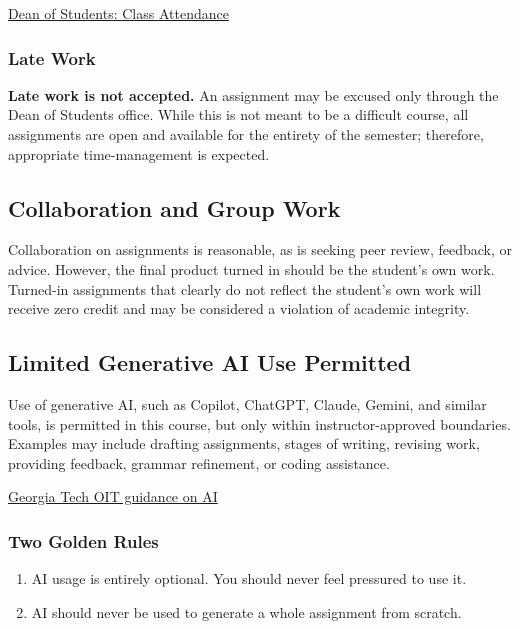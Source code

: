 \documentclass[11pt]{article}
\begin{document}
\href{https://studentlife.gatech.edu/dean-students/class-attendance}{Dean of Students: Class Attendance}

\subsubsection*{Late Work}

\textbf{Late work is not accepted.} An assignment may be excused only through the Dean of Students office. While this is not meant to be a difficult course, all assignments are open and available for the entirety of the semester; therefore, appropriate time-management is expected.

\subsection*{Collaboration and Group Work}

Collaboration on assignments is reasonable, as is seeking peer review, feedback, or advice. However, the final product turned in should be the student's own work. Turned-in assignments that clearly do not reflect the student's own work will receive zero credit and may be considered a violation of academic integrity.

\subsection*{Limited Generative AI Use Permitted}

Use of generative AI, such as Copilot, ChatGPT, Claude, Gemini, and similar tools, is permitted in this course, but only within instructor-approved boundaries. Examples may include drafting assignments, stages of writing, revising work, providing feedback, grammar refinement, or coding assistance.

\href{https://oit.gatech.edu/ai/guidance}{Georgia Tech OIT guidance on AI}

\subsubsection*{Two Golden Rules}

\begin{enumerate}[nosep]
    \item AI usage is entirely optional. You should never feel pressured to use it.
    \item AI should never be used to generate a whole assignment from scratch.
\end{enumerate}
\end{document}
